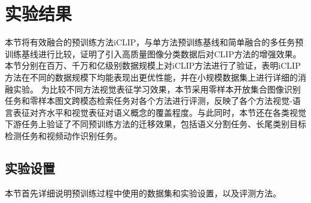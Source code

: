 \section{实验结果}
\label{sec:iclip-result}
本节将有效融合的预训练方法iCLIP，与单方法预训练基线和简单融合的多任务预训练基线进行比较，证明了引入高质量图像分类数据后对CLIP方法的增强效果。
本节分别在百万、千万和亿级别数据规模上对iCLIP方法进行了验证，表明iCLIP方法在不同的数据规模下均能表现出更优性能，并在小规模数据集上进行详细的消融实验。
为比较不同方法视觉表征学习效果，本节采用零样本开放集合图像识别任务和零样本图文跨模态检索任务对各个方法进行评测，反映了各个方法视觉-语言表征对齐水平和视觉表征对语义概念的覆盖程度。与此同时，本节还在各类视觉下游任务上验证了不同预训练方法的迁移效果，包括语义分割任务、长尾类别目标检测任务和视频动作识别任务。

\subsection{实验设置}
\label{sec:iclip-exp-setting}
本节首先详细说明预训练过程中使用的数据集和实验设置，以及评测方法。

